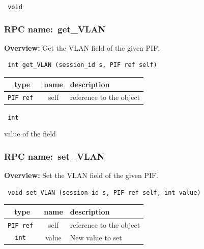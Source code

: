 \vspace{0.3cm}

{\tt 
void
}



\vspace{0.3cm}
\vspace{0.3cm}
\vspace{0.3cm}
\subsubsection{RPC name:~get\_VLAN}

{\bf Overview:} 
Get the VLAN field of the given PIF.

\begin{verbatim} int get_VLAN (session_id s, PIF ref self)\end{verbatim}



 
\vspace{0.3cm}
\begin{tabular}{|c|c|p{7cm}|}
 \hline
{\bf type} & {\bf name} & {\bf description} \\ \hline
{\tt PIF ref } & self & reference to the object \\ \hline 

\end{tabular}

\vspace{0.3cm}

{\tt 
int
}


value of the field
\vspace{0.3cm}
\vspace{0.3cm}
\vspace{0.3cm}
\subsubsection{RPC name:~set\_VLAN}

{\bf Overview:} 
Set the VLAN field of the given PIF.

\begin{verbatim} void set_VLAN (session_id s, PIF ref self, int value)\end{verbatim}



 
\vspace{0.3cm}
\begin{tabular}{|c|c|p{7cm}|}
 \hline
{\bf type} & {\bf name} & {\bf description} \\ \hline
{\tt PIF ref } & self & reference to the object \\ \hline 

{\tt int } & value & New value to set \\ \hline 

\end{tabular}


